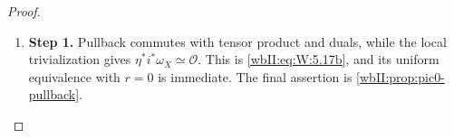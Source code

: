\begin{proof}
\begin{enumerate}[label={$\langle1\rangle$\arabic*.},leftmargin=*]
\item 
\noindent\textbf{Step 1.} Pullback commutes with tensor product and duals, while the local
trivialization gives $\eta^*i^*\omega_X\simeq\mathcal O$.  This is \eqref{wbII:eq:W:5.17b},
and its uniform equivalence with $r=0$ is immediate.  The final assertion is
\cref{wbII:prop:pic0-pullback}.

\end{enumerate}
\end{proof}
